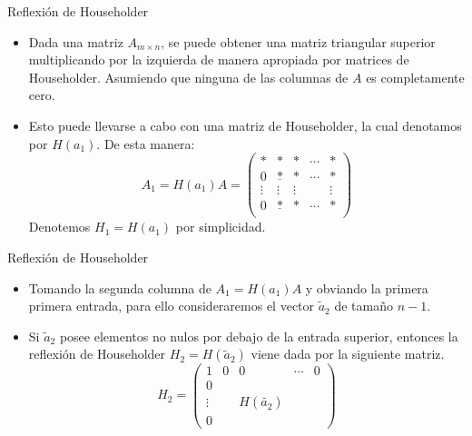 \documentclass{beamer}
\begin{document}
\begin{frame}{Reflexi\'on de Householder}
  \begin{itemize}
    \item<1-> Dada una matriz $A_{m\times n}$, se puede obtener una matriz triangular superior multiplicando por la izquierda de manera apropiada por
    matrices de Householder. Asumiendo que ninguna de las columnas de $A$ es completamente cero.
    \item<2-> Esto puede llevarse a cabo con una matriz de Householder, la cual denotamos por $H(a_1)$. De esta manera:
    $$
    A_1 = H(a_1)A = \left(\begin{array}{ccccc}
                           *&*&*&\cdots&*\\
                           0&\underline{*}&*&\cdots&*\\                           
                           \vdots&\vdots&\vdots&& \vdots\\
                           0&\underline{*}&*&\cdots&*\\    
                          \end{array}
    \right)
    $$    
    Denotemos $H_1=H(a_1)$ por simplicidad.  
  \end{itemize}
\end{frame}
\begin{frame}{Reflexi\'on de Householder}
  \begin{itemize}
    \item<1-> Tomando la segunda columna de $A_1=H(a_1)A$ y obviando la primera primera entrada, para ello consideraremos el vector
    $\tilde a_2$ de tama\~no $n-1$.    
    \item<2-> Si $\tilde a_2$ posee elementos no nulos por debajo de la entrada superior, entonces la reflexi\'on  de Householder
    $H_2=H(\tilde a_2)$ viene dada por la siguiente matriz.    
    $$
    H_2 = \left(\begin{array}{c|cccc}
                 1      & 0 & 0               & \cdots & 0 \\\hline
                 0      &   &                 &        &\\
                 \vdots &   & H(\tilde {a_2}) &        &\\
                 0      &   &                 &        &
                \end{array}
     \right)
    $$
    \end{itemize}
\end{frame}
\end{document}
